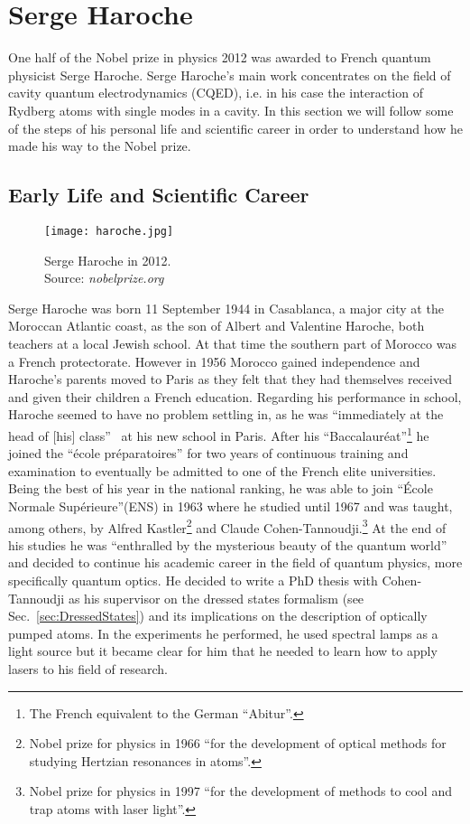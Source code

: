 \section{Serge Haroche}
\label{sec:Haroche}
One half of the Nobel prize in physics 2012 was awarded to French quantum
physicist Serge Haroche. Serge Haroche's main work concentrates on the field of
cavity quantum electrodynamics (CQED), i.e. in his case the interaction of
Rydberg atoms with single modes in a cavity. In this section we will follow some
of the steps of his personal life and scientific career in order to understand how he
made his way to the Nobel prize. 

\subsection{Early Life and Scientific Career}
\begin{wrapfigure}{r}{0.33\textwidth}
  \centering
  \texttt{[image: haroche.jpg]}
  \caption{Serge Haroche in 2012.\\ Source: \textit{nobelprize.org}}
\end{wrapfigure}
Serge Haroche was born 11 September 1944 in Casablanca, a major city at the
Moroccan Atlantic coast, as the son of Albert and
Valentine Haroche, both teachers at a local Jewish school. At that time the
southern part of Morocco was a French protectorate. However in 1956 Morocco
gained independence and Haroche's parents moved to Paris as they felt that they
had themselves received and given their children a French education. Regarding
his performance in school, Haroche seemed to have no problem settling in, as he
was ``immediately at the head of [his] class''~\cite{shbio} at his new school in
Paris. After his ``Baccalauréat''\footnote{The French equivalent to the German
``Abitur''.} he joined the  ``école préparatoires'' for two years of continuous training and examination to
eventually be admitted to one of the French elite universities. Being the best
of his year in the national ranking, he was able to join ``École Normale
Supérieure''(ENS) in 1963 where he studied until 1967 and was taught, among
others, by Alfred Kastler\footnote{Nobel prize for physics in 1966 ``for the
development of optical methods for studying Hertzian resonances in atoms''.} and
Claude Cohen-Tannoudji.\footnote{Nobel prize for physics in 1997 ``for the
development of methods to cool and trap atoms with laser light''.} At the end of
his studies he was ``enthralled by the mysterious beauty of the quantum
world''~\cite{shbio} and decided to continue his academic career in the field of
quantum physics, more specifically quantum optics. He decided to write a PhD
thesis with Cohen-Tannoudji as his supervisor on the dressed states
formalism (see
Sec.~\ref{sec:DressedStates}) and its implications on the description of
optically pumped atoms. In the experiments he performed, he used spectral lamps
as a light source but it became clear for him that he needed to learn how to
apply lasers to his field of research.

